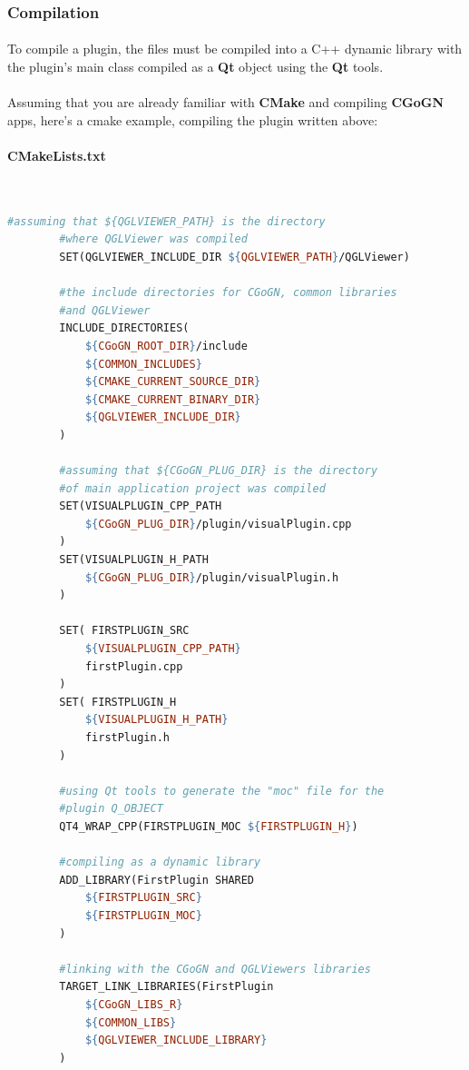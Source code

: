 \documentclass[a4paper]{scrreprt}
\begin{document}
	
	\subsubsection{Compilation}
	\paragraph{}	
	To compile a plugin, the files must be compiled into a C++ dynamic library with
	the plugin's main class compiled as a \textbf{Qt} object using the \textbf{Qt}
	tools.
	\paragraph{}
	Assuming that you are already familiar with \textbf{CMake} and compiling
	\textbf{CGoGN} apps, here's a cmake example, compiling the plugin written
	above:
	\paragraph{CMakeLists.txt}~
	\begin{lstlisting}[language=make]
		#assuming that ${QGLVIEWER_PATH} is the directory
		#where QGLViewer was compiled
		SET(QGLVIEWER_INCLUDE_DIR ${QGLVIEWER_PATH}/QGLViewer)

		#the include directories for CGoGN, common libraries
		#and QGLViewer
		INCLUDE_DIRECTORIES(
			${CGoGN_ROOT_DIR}/include
			${COMMON_INCLUDES}
			${CMAKE_CURRENT_SOURCE_DIR}
			${CMAKE_CURRENT_BINARY_DIR}
			${QGLVIEWER_INCLUDE_DIR}
		)
		
		#assuming that ${CGoGN_PLUG_DIR} is the directory
		#of main application project was compiled
		SET(VISUALPLUGIN_CPP_PATH
			${CGoGN_PLUG_DIR}/plugin/visualPlugin.cpp
		)
		SET(VISUALPLUGIN_H_PATH
			${CGoGN_PLUG_DIR}/plugin/visualPlugin.h
		)
		
		SET( FIRSTPLUGIN_SRC
			${VISUALPLUGIN_CPP_PATH}
		    firstPlugin.cpp
		)
		SET( FIRSTPLUGIN_H
			${VISUALPLUGIN_H_PATH}
		    firstPlugin.h
		)
		
		#using Qt tools to generate the "moc" file for the 
		#plugin Q_OBJECT
		QT4_WRAP_CPP(FIRSTPLUGIN_MOC ${FIRSTPLUGIN_H})
	
		#compiling as a dynamic library
		ADD_LIBRARY(FirstPlugin SHARED
			${FIRSTPLUGIN_SRC}
			${FIRSTPLUGIN_MOC}
		)
	
		#linking with the CGoGN and QGLViewers libraries
		TARGET_LINK_LIBRARIES(FirstPlugin
			${CGoGN_LIBS_R}
			${COMMON_LIBS}
			${QGLVIEWER_INCLUDE_LIBRARY}
		)
	\end{lstlisting}
	
\end{document}
